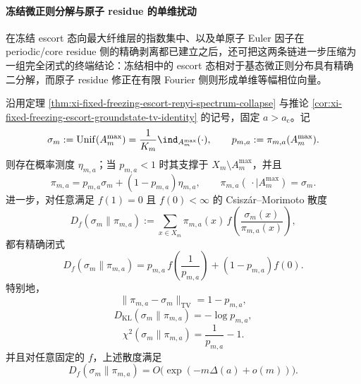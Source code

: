 \paragraph{冻结微正则分解与原子 residue 的单维扰动}
在冻结 escort 态向最大纤维层的指数集中、以及单原子 Euler 因子在 periodic/core residue 侧的精确剥离都已建立之后，还可把这两条链进一步压缩为一组完全闭式的终端结论：冻结相中的 escort 态相对于基态微正则分布具有精确二分解，而原子 residue 修正在有限 Fourier 侧则形成单维等幅相位向量。

\begin{conclusion}\label{con:xi-time-part57ba-freezing-escort-groundstate-fdiv-closed}
沿用定理 \ref{thm:xi-fixed-freezing-escort-renyi-spectrum-collapse} 与推论 \ref{cor:xi-fixed-freezing-escort-groundstate-tv-identity} 的记号，固定 \(a>a_{\mathrm c}\)。记
\[
\sigma_m:=\mathrm{Unif}(A_m^{\max})
=\frac{1}{K_m}\ind_{A_m^{\max}}(\cdot),
\qquad
p_{m,a}:=\pi_{m,a}(A_m^{\max}).
\]
则存在概率测度 \(\eta_{m,a}\)；当 \(p_{m,a}<1\) 时其支撑于 \(X_m\setminus A_m^{\max}\)，并且
\[
\pi_{m,a}=p_{m,a}\sigma_m+(1-p_{m,a})\eta_{m,a},
\qquad
\pi_{m,a}(\,\cdot\mid A_m^{\max})=\sigma_m.
\]
进一步，对任意满足 \(f(1)=0\) 且 \(f(0)<\infty\) 的 Csisz\'ar--Morimoto 散度
\[
D_f(\sigma_m\|\pi_{m,a})
:=
\sum_{x\in X_m}\pi_{m,a}(x)\,
f\!\left(\frac{\sigma_m(x)}{\pi_{m,a}(x)}\right),
\]
都有精确闭式
\[
\boxed{\;
D_f(\sigma_m\|\pi_{m,a})
=
p_{m,a}\,f\!\left(\frac{1}{p_{m,a}}\right)
+(1-p_{m,a})f(0).\;}
\]
特别地，
\[
\boxed{\;
\|\pi_{m,a}-\sigma_m\|_{\mathrm{TV}}=1-p_{m,a},\;}
\]
\[
\boxed{\;
D_{\mathrm{KL}}(\sigma_m\|\pi_{m,a})=-\log p_{m,a},\;}
\]
\[
\boxed{\;
\chi^2(\sigma_m\|\pi_{m,a})=\frac{1}{p_{m,a}}-1.\;}
\]
并且对任意固定的 \(f\)，上述散度满足
\[
D_f(\sigma_m\|\pi_{m,a})
=
O\!\bigl(\exp(-m\Delta(a)+o(m))\bigr).
\]
\end{conclusion}
